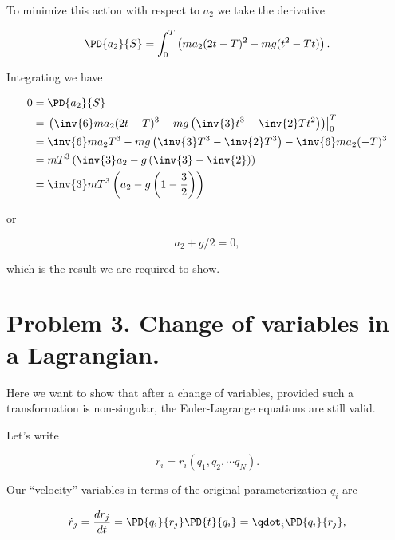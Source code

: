 To minimize this action with respect to $a_2$ we take the derivative

\begin{equation}\label{eqn:classicalMechanicsPs1:n}
\PD{a_2}{S} = \int_0^T
\left( 
m a_2 (2 t - T )^2 - m g (t^2 - T t)
\right).
\end{equation}

Integrating we have

\begin{align*}
0 &= \PD{a_2}{S} \\
&={\left.
\left(
\inv{6} m a_2 (2 t - T )^3 - m g \left(\inv{3}t^3 - \inv{2}T t^2 \right)
\right)\right\vert}_0^T \\
&=
\inv{6} m a_2 T^3 - m g \left(\inv{3}T^3 - \inv{2}T^3 \right)
-
\inv{6} m a_2 (- T )^3 \\
&=
m T^3 \left( \inv{3} a_2 - g \left( \inv{3} - \inv{2} \right) \right) \\
&=
\inv{3} m T^3 \left( a_2 - g \left( 1 - \frac{3}{2} \right) \right) \\
\end{align*}

or

\begin{equation}\label{eqn:classicalMechanicsPs1:n}
a_2 + g/2 = 0,
\end{equation}

which is the result we are required to show.

\section{Problem 3.  Change of variables in a Lagrangian.}

Here we want to show that after a change of variables, provided such a transformation is non-singular, the Euler-Lagrange equations are still valid.

Let's write

\begin{equation}\label{eqn:classicalMechanicsPs1:n}
r_i = r_i(q_1, q_2, \cdots q_N).
\end{equation}

Our ``velocity'' variables in terms of the original parameterization $q_i$ are

\begin{equation}\label{eqn:classicalMechanicsPs1:n}
\dot{r}_j = \frac{dr_j}{dt} = \PD{q_i}{r_j} \PD{t}{q_i} = \qdot_i \PD{q_i}{r_j},
\end{equation}

